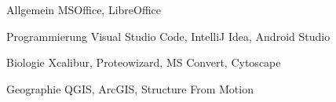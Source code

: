 

\begin{cvpairs}

  
\cvpair
    {Allgemein} %
    {MSOffice, LibreOffice} %

  
\cvpair
    {Programmierung} %
    {Visual Studio Code, IntelliJ Idea, Android Studio} %

  
\cvpair
    {Biologie} %
    {Xcalibur, Proteowizard, MS Convert, Cytoscape} %

  
\cvpair
    {Geographie} %
    {QGIS, ArcGIS, Structure From Motion} %

\end{cvpairs}